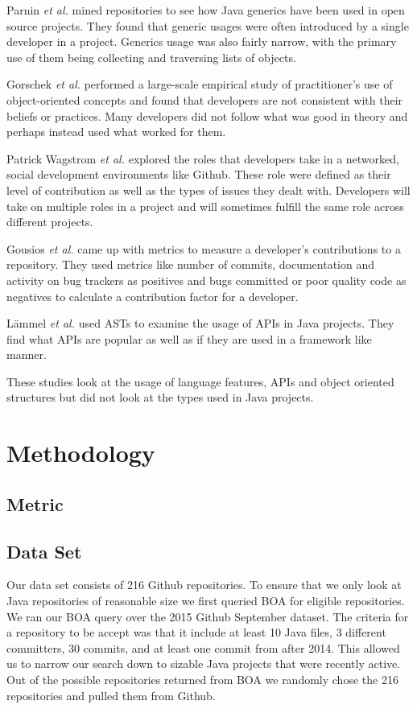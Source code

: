 \documentclass{sig-alternate-05-2015}
\begin{document}
Parnin \textit{et al.} \cite{Parnin:2011:JGA:1985441.1985446} mined repositories to see how Java generics have been used in open source projects. They found that generic usages were often introduced by a single developer in a project. Generics usage was also fairly narrow, with the primary use of them being collecting and traversing lists of objects.

Gorschek \textit{et al.} \cite{Gorschek:2010:LES:1806799.1806820} performed a large-scale empirical study of practitioner's use of object-oriented concepts and found that developers are not consistent with their beliefs or practices. Many developers did not follow what was good in theory and perhaps instead used what worked for them.

Patrick Wagstrom \textit{et al.} \cite{Patrick:Wagstrom:2012} explored the roles that developers take in a networked, social development environments like Github. These role were defined as their level of contribution as well as the types of issues they dealt with. Developers will take on multiple roles in a project and will sometimes fulfill the same role across different projects.

Gousios \textit{et al.} \cite{KGSP09} came up with metrics to measure a developer's contributions to a repository. They used metrics like number of commits, documentation and activity on bug trackers as positives and bugs committed or poor quality code as negatives to calculate a contribution factor for a developer.

L\"{a}mmel \textit{et al.} \cite{Lammel:2011:LAA:1982185.1982471} used ASTs to examine the usage of APIs in Java projects. They find what APIs are popular as well as if they are used in a framework like manner. 

These studies look at the usage of language features, APIs and object oriented structures but did not look at the types used in Java projects.


\section{Methodology}
\subsection{Metric}

\subsection{Data Set}
Our data set consists of 216 Github repositories. To ensure that we only look at Java repositories of reasonable size we first queried BOA \cite{Dyer-Nguyen-Rajan-Nguyen-13} for eligible repositories. We ran our BOA query over the 2015 Github September dataset. The criteria for a repository to be accept was that it include at least 10 Java files, 3 different committers, 30 commits, and at least one commit from after 2014. This allowed us to narrow our search down to sizable Java projects that were recently active. Out of the possible repositories returned from BOA we randomly chose the 216 repositories and pulled them from Github.
\end{document}
